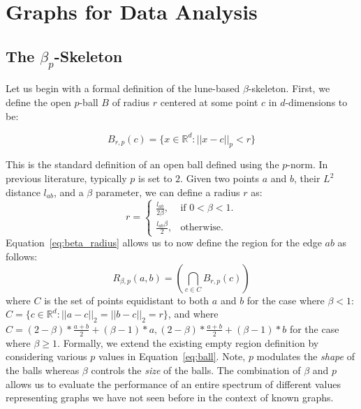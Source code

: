 
\chapter{Graphs for Data Analysis}
\label{ch:graphs}


\section{The $\beta_p$-Skeleton}
\label{sec:bpskeleton}
Let us begin with a formal definition of the lune-based $\beta$-skeleton.
%
First, we define the open $p$-ball $B$ of radius $r$ centered at some point $c$ in $d$-dimensions to be:

\begin{equation}
\label{eq:ball}
    B_{r,p}(c) = \{x \in \mathbb{R}^d : || x  - c ||_p < r\}
\end{equation}

This is the standard definition of an open ball defined using the $p$-norm.
%
In previous literature, typically $p$ is set to $2$.
%
Given two points $a$ and $b$, their $L^2$ distance $l_{ab}$, and a $\beta$ parameter, we can define a radius $r$ as:
%
\begin{equation}
    \label{eq:beta_radius}
    r =
    \begin{cases}
        \frac{l_{ab}}{2\beta}, & \text{if $0 < \beta < 1$}.\\
        \frac{l_{ab}\beta}{2}, & \text{otherwise}.
    \end{cases}
\end{equation}
%
Equation~\ref{eq:beta_radius} allows us to now define the region for the edge $ab$ as follows:
%
\begin{equation}
    R_{\beta,p}(a,b) = \left(\bigcap_{c \in C} B_{r,p}(c)\right)
\end{equation}
%
where $C$ is the set of points equidistant to both $a$ and $b$ for the case where $\beta < 1$: $C = \{c \in \mathbb{R}^d: ||a -c||_2 = ||b - c||_2 = r\}$, and where $C = {(2-\beta)*\frac{a+b}{2} + (\beta-1)*a, (2-\beta)*\frac{a+b}{2} + (\beta-1)*b}$ for the case where $\beta \geq 1$.
%
Formally, we extend the existing empty region definition by considering various $p$ values in Equation~\ref{eq:ball}.
%
Note, $p$ modulates the \emph{shape} of the balls whereas $\beta$ controls the \emph{size} of the balls.
%
The combination of $\beta$ and $p$ allows us to evaluate the performance of an entire spectrum of different values representing graphs we have not seen before in the context of known graphs.

